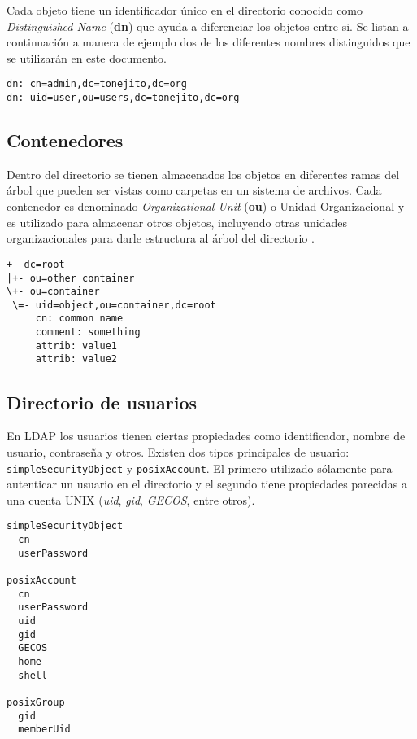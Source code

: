 Cada objeto tiene un identificador \'{u}nico en el directorio conocido como \textit{Distinguished Name} (\textbf{dn}) que ayuda a diferenciar los objetos entre si. Se listan a continuaci\'{o}n a manera de ejemplo dos de los diferentes nombres distinguidos que se utilizar\'{a}n en este documento.

{
\scriptsize
\linespread{1}
\begin{center}
  \verb|dn: cn=admin,dc=tonejito,dc=org|
  \\
  \verb|dn: uid=user,ou=users,dc=tonejito,dc=org|
\end{center}
}

  \subsection{Contenedores}

Dentro del directorio se tienen almacenados los objetos en diferentes ramas del \'{a}rbol que pueden ser vistas como carpetas en un sistema de archivos. Cada contenedor es denominado \textit{Organizational Unit} (\textbf{ou}) o Unidad Organizacional y es utilizado para almacenar otros objetos, incluyendo otras unidades organizacionales para darle estructura al \'{a}rbol del directorio \cite{_appendix_????}.

{
\scriptsize
\linespread{1}
\begin{verbatim}
+- dc=root
|+- ou=other container
\+- ou=container
 \=- uid=object,ou=container,dc=root
     cn: common name
     comment: something
     attrib: value1
     attrib: value2
\end{verbatim}
}

  \subsection {Directorio de usuarios}

En \textsc{LDAP}  los usuarios tienen ciertas propiedades como identificador, nombre de usuario, contrase\~{n}a y otros. Existen dos tipos principales de usuario: \verb/simpleSecurityObject/ y \verb/posixAccount/. El primero utilizado s\'{o}lamente para autenticar un usuario en el directorio y el segundo tiene propiedades parecidas a una cuenta \textsc{UNIX} (\textit{uid}, \textit{gid}, \textit{GECOS}, entre otros).

{
\scriptsize
\linespread{1}
\begin{verbatim}
simpleSecurityObject
  cn
  userPassword

posixAccount
  cn
  userPassword
  uid
  gid
  GECOS
  home
  shell

posixGroup
  gid
  memberUid
\end{verbatim}
}

